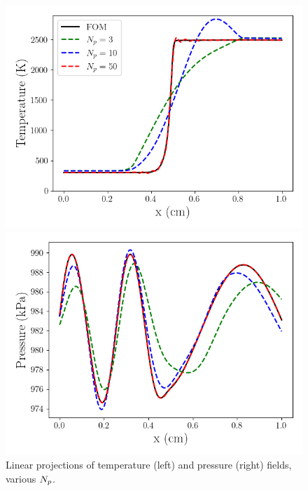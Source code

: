 \begin{figure}
    \begin{minipage}{0.49\linewidth}
        \includegraphics[width=0.99\linewidth]{Chapters/TransientFlame/Images/linear/proj_temp_snaps.png}
    \end{minipage}
    \begin{minipage}{0.49\linewidth}
        \includegraphics[width=0.99\linewidth]{Chapters/TransientFlame/Images/linear/proj_press_snaps.png}
    \end{minipage}
    \caption{Linear projections of temperature (left) and pressure (right) fields, various $N_p$.}
\end{figure}